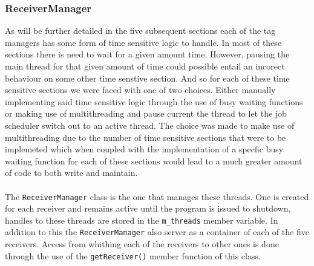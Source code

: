\documentclass[11pt]{article}
\begin{document}
\subsubsection{ReceiverManager}
As will be further detailed in the five subsequent sections each of the tag
managers has some form of time sensitive logic to handle. In most of these
sections there is need to wait for a given amount time. However, pausing the
main thread for that given amount of time could possible entail an incorect
behaviour on some other time senstive section. And so for each of these time
sensitive sections we were faced with one of two choices. Either manually
implementing said time sensitive logic through the use of busy waiting functions
or making use of multithreading and pause current the thread to let the job
scheduler switch out to an active thread. The choice was made to make use of
multithreading due to the number of time sensitive sections that were to be
implemeted which when coupled with the implementation of a specfic busy waiting
function for each of these sections would lead to a much greater amount of code
to both write and maintain.\\\\ The \texttt{ReceiverManager} class is the one
that manages these threads. One is created for each receiver and remains active
until the program is issued to shutdown, handles to these threads are stored in
the \texttt{m\_threads} member variable. In addition to this the
\texttt{ReceiverManager} also server as a container of each of the five
receivers. Access from whithing each of the receivers to other ones is done
through the use of the \texttt{getReceiver()} member function of this class.
\end{document}
